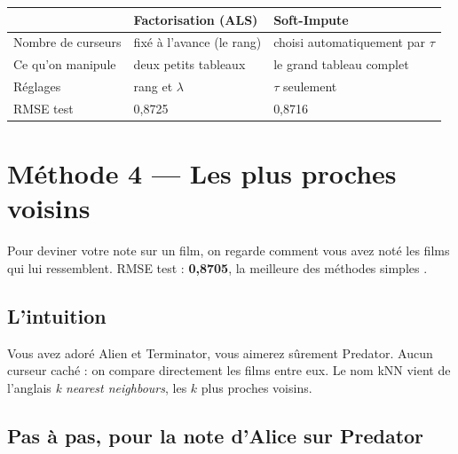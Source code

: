 \documentclass[11pt,a4paper]{article}
\begin{document}
\begin{center}
\begin{tabular}{lll}
\toprule
 & \textbf{Factorisation (ALS)} & \textbf{Soft-Impute} \\
\midrule
Nombre de curseurs & fixé à l'avance (le rang) & choisi automatiquement par $\tau$ \\
Ce qu'on manipule & deux petits tableaux & le grand tableau complet \\
Réglages & rang et $\lambda$ & $\tau$ seulement \\
RMSE test & 0,8725 & 0,8716 \\
\bottomrule
\end{tabular}
\end{center}

\section{Méthode 4 --- Les plus proches voisins}\label{sec:knn}

\begin{enbref}
Pour deviner votre note sur un film, on regarde comment vous avez noté les films qui lui
ressemblent. RMSE test : \textbf{0,8705}, la meilleure des méthodes \og simples \fg.
\end{enbref}

\subsection{L'intuition}

\og Vous avez adoré Alien et Terminator, vous aimerez sûrement Predator. \fg
Aucun curseur caché : on compare directement les films entre eux. Le nom kNN vient de
l'anglais \emph{k nearest neighbours}, les $k$ plus proches voisins.

\subsection{Pas à pas, pour la note d'Alice sur Predator}
\end{document}
